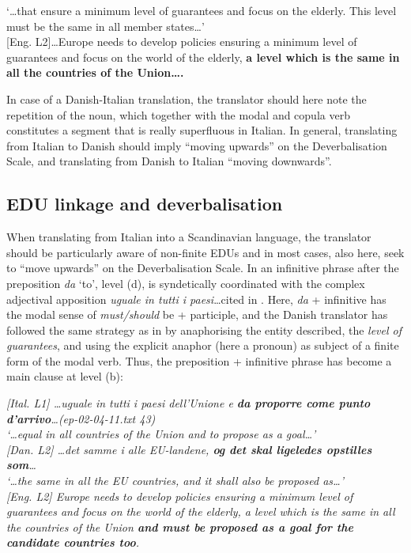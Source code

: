 \documentclass[output=paper]{LSP/langsci}
\begin{document}
   `\ldots that ensure a minimum level of guarantees and focus on the elderly. This level must be the same in all member states\ldots '\\

\textup{[Eng. L2]}\ldots Europe needs to develop policies ensuring a minimum level of guarantees and focus on the world of the elderly, \textbf{a level which is the same in all the countries of the Union\ldots .}
\z

In case of a Danish-Italian translation, the translator should here note the repetition of the noun, which together with the modal and copula verb constitutes a segment that is really superfluous in Italian. In general, translating from Italian to Danish should imply ``moving upwards'' on the Deverbalisation Scale, and translating from Danish to Italian ``moving downwards''. 

\subsection{EDU linkage and deverbalisation}\label{sec:korzen:4.2}

When translating from Italian into a Scandinavian language, the translator should be particularly aware of non-finite EDUs and in most cases, also here, seek to ``move upwards'' on the Deverbalisation Scale. In  an infinitive phrase after the preposition \textit{da} `to', level (d), is syndetically coordinated with the complex adjectival apposition \textit{uguale in tutti i paesi}\ldots cited in . Here, \textit{da} + infinitive has the modal sense of \textit{must/should} be + participle, and the Danish translator has followed the same strategy as in  by anaphorising the entity described, the \textit{level of guarantees}, and using the explicit anaphor (here a pronoun) as subject of a finite form of the modal verb. Thus, the preposition + infinitive phrase has become a main clause at level (b):

\ea\label{ex:korzen:18}
\textit{\textup{[Ital. L1]} \ldots  uguale in tutti i paesi dell'Unione e\textbf{ da proporre come punto d'arrivo}\ldots  \textup{(ep-02-04-11.txt 43)}\\
  `\ldots  equal in all countries of the Union and to propose as a goal\ldots '\\ 
  \textup{[Dan. L2]} \ldots det samme i alle EU-landene,\textbf{ og det skal ligeledes opstilles som}\ldots  \\
  `\ldots  the same in all the EU countries, and it shall also be proposed as\ldots '\\
\textup{[Eng. L2]} Europe needs to develop policies ensuring a minimum level of guarantees and focus on the world of the elderly, a level which is the same in all the countries of the Union \textbf{and must be proposed as a goal for the candidate countries too}.}
\z
\end{document}

